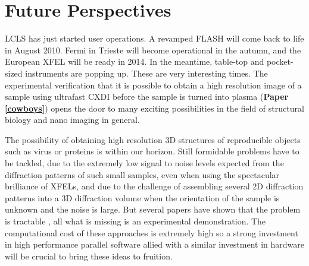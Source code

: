 \chapter{Future Perspectives}\label{Future Perspectives}\noindent

LCLS has just started user operations. A revamped FLASH will come back to life
in August 2010. Fermi in Trieste will become operational in the autumn, and the
European XFEL will be ready in 2014. In the meantime, table-top and pocket-sized
instruments are popping up. These are very interesting times. The experimental
verification that it is possible to obtain a high resolution image of a sample
using ultrafast CXDI before the sample is turned into plasma ({\bf Paper
  \ref{cowboys}}) opens the door to many exciting possibilities in the field of
structural biology and nano imaging in general.

The possibility of obtaining high resolution 3D structures of reproducible
objects such as virus or proteins is within our horizon. Still formidable
problems have to be tackled, due to the extremely low signal to noise levels
expected from the diffraction patterns of such small samples, even when using
the spectacular brilliance of XFELs, and due to the challenge of assembling
several 2D diffraction patterns into a 3D diffraction volume when the
orientation of the sample is unknown and the noise is large. But several papers
have shown that the problem is tractable \cite{Elser2009Noise,NeTeDuaneLoh2009Reconstruction,Fung2008Structure}, all
what is missing is an experimental demonstration. The computational cost of
these approaches is extremely high so a strong investment in high
performance parallel software allied with a similar investment in hardware will
be crucial to bring these ideas to fruition.



